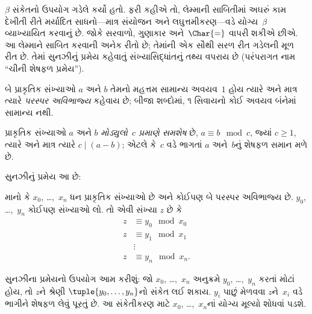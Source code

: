 $\beta$ સંકેતનો ઉપયોગ ગડેલે કર્યો
હતો. ફરી કહીએ તો, લેમ્માની
સાબિતીમાં અઘરું કામ દેખીતી રીતે
મર્યાદિત સાધનો—માત્ર સંયોજન અને
લઘુત્તમીકરણ—વડે યોગ્ય~$\beta$
વ્યાખ્યાયિત કરવાનું છે. જોકે સરવાળો,
ગુણાકાર અને~$\Char{=}$ વાપરી
શકીએ છીએ. આ લેમ્માને સાબિત
કરવાની અનેક રીતો છે; તેમાંની એક
સૌથી સરળ રીત ગડેલની મૂળ રીત છે.
તેમાં સુનઝીનું પ્રમેય કહેવાતું
સંખ્યાસિદ્ધાંતનું તથ્ય વપરાય છે
(પરંપરાગત નામ ``ચીની શેષફળ પ્રમેય'').

\begin{defn}
બે પ્રાકૃતિક સંખ્યાઓ $a$ અને $b$
તેમનો મહત્તમ સામાન્ય અવયવ~$1$
હોય ત્યારે અને માત્ર ત્યારે
\emph{પરસ્પર અવિભાજ્ય} કહેવાય છે;
બીજા શબ્દોમાં, ૧ સિવાયનો
કોઈ અવયવ બંનેમાં સામાન્ય નથી.
\end{defn}

\begin{defn}
પ્રાકૃતિક સંખ્યાઓ $a$ અને $b$
\emph{મોડ્યુલો~$c$ પ્રમાણે સમશેષ}
છે, $a \equiv b \mod c$, જ્યાં $c\geq1$, ત્યારે
અને માત્ર ત્યારે $c \mid (a-b)$;
એટલે કે~$c$ વડે ભાગતાં
$a$ અને~$b$નું
શેષફળ સમાન મળે છે.
\end{defn}

સુનઝીનું પ્રમેય આ છે:
\begin{thm}
માનો કે $x_0$, \dots,~$x_n$ ધન પ્રાકૃતિક સંખ્યાઓ છે અને
કોઈપણ બે પરસ્પર અવિભાજ્ય છે.
$y_0$, \dots,~$y_n$ કોઈપણ
સંખ્યાઓ લો. તો એવી સંખ્યા $z$
છે કે
\begin{align*}
z & \equiv y_0 \mod x_0 \\
z & \equiv y_1 \mod x_1 \\
& \vdots  \\
z & \equiv y_n \mod x_n.
\end{align*}
\end{thm}

સુનઝીના પ્રમેયનો ઉપયોગ આમ કરીશું:
જો $x_0$, \dots,~$x_n$ અનુક્રમે
$y_0$, \dots,~$y_n$ કરતાં મોટાં
હોય, તો $z$ને શ્રેણી
$\tuple{y_0, \dots,y_n}$નો
સંકેત લઈ શકાય. $y_i$ પાછું
મેળવવા $z$ને~$x_i$ વડે ભાગીને
શેષફળ લેવું પૂરતું છે. આ
સંકેતીકરણ માટે $x_0$,
\dots,~$x_n$નાં યોગ્ય મૂલ્યો
શોધવાં પડશે.

